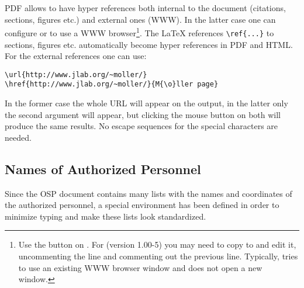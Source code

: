 \documentclass[12pt,letterpaper]{article}
\begin{document}
  PDF allows to have hyper references both internal to the document
  (citations, sections, figures etc.) and external ones (WWW). In the latter
  case one can configure  or 
  to use a WWW browser\footnote{
    Use the  button
   on . For  (version 1.00-5)
   you may need to copy 
   to  and edit it, uncommenting the line
        
   and commenting out the previous line.
   Typically,  tries to use an existing WWW browser
   window and does not open a new window.
  }.
  The \LaTeX{} references {\color{blue}\verb|\ref{...}|} to sections, 
  figures etc. automatically become hyper references in PDF and HTML.
  For the external references one can use:
  {\color{blue}
   \begin{verbatim}
\url{http://www.jlab.org/~moller/}
\href{http://www.jlab.org/~moller/}{M{\o}ller page}
  \end{verbatim}%
  }\noindent
  In the former case the whole URL will appear on the output,
  in the latter only the second argument will appear,
  but clicking the mouse button on both will produce the same
  results. No escape sequences for the special characters are 
  needed.

\subsection{Names of Authorized Personnel}
\label{sec:personnel}
Since the OSP document contains many lists with the names and coordinates 
of the authorized personnel, a special environment has been defined
in order to minimize typing and make these lists look standardized.
\end{document}
